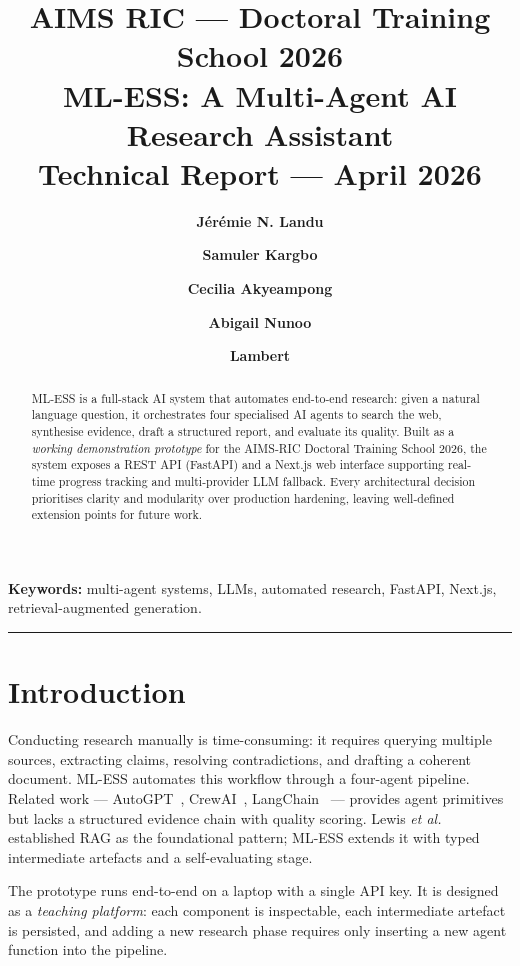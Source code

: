 \documentclass[10pt, twocolumn]{article}
\title{%
  \vspace{-1.2em}%
  {\large\textbf{AIMS RIC — Doctoral Training School 2026}}\\[3pt]
  {\Large\bfseries\color{aims-blue} ML-ESS: A Multi-Agent AI Research Assistant}\\[3pt]
  {\normalsize Technical Report — April 2026}%
}
\author[1]{\textbf{Jérémie N. Landu}}
\author[1]{\textbf{Samuler Kargbo}}
\author[1]{\textbf{Cecilia Akyeampong}}
\author[1]{\textbf{Abigail Nunoo}}
\author[1]{\textbf{Lambert}}
\affil[1]{%
  \small African Institute for Mathematical Sciences —
  Research Innovation Centre (AIMS-RIC),
  Doctoral Training School 2026.
  \texttt{jeremy@aimsammi.org}
}
\date{}
\begin{document}

\maketitle
\thispagestyle{fancy}
\vspace{-0.8em}

\begin{abstract}
ML-ESS is a full-stack AI system that automates end-to-end research: given a
natural language question, it orchestrates four specialised AI agents to search
the web, synthesise evidence, draft a structured report, and evaluate its
quality. Built as a \emph{working demonstration prototype} for the AIMS-RIC
Doctoral Training School 2026, the system exposes a REST API (FastAPI) and a
Next.js web interface supporting real-time progress tracking and multi-provider
LLM fallback. Every architectural decision prioritises clarity and modularity
over production hardening, leaving well-defined extension points for future
work.
\end{abstract}

\noindent\textbf{Keywords:} multi-agent systems, LLMs, automated research,
FastAPI, Next.js, retrieval-augmented generation.

\vspace{2pt}\hrule\vspace{4pt}

\section{Introduction}

Conducting research manually is time-consuming: it requires querying multiple
sources, extracting claims, resolving contradictions, and drafting a coherent
document. ML-ESS automates this workflow through a four-agent pipeline.
Related work — AutoGPT~\cite{autogpt}, CrewAI~\cite{crewai},
LangChain~\cite{langchain} — provides agent primitives but lacks a structured
evidence chain with quality scoring. Lewis \textit{et al.}~\cite{rag}
established RAG as the foundational pattern; ML-ESS extends it with typed
intermediate artefacts and a self-evaluating stage.

The prototype runs end-to-end on a laptop with a single API key. It is
designed as a \emph{teaching platform}: each component is inspectable, each
intermediate artefact is persisted, and adding a new research phase requires
only inserting a new agent function into the pipeline.
\end{document}
